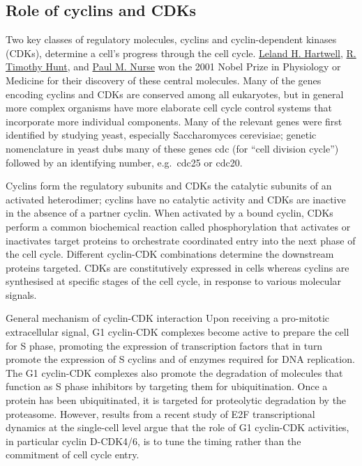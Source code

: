 \hypertarget{role-of-cyclins-and-cdks}{%
\subsection{Role of cyclins and CDKs}\label{role-of-cyclins-and-cdks}}

Two key classes of regulatory molecules, cyclins and cyclin-dependent kinases (CDKs), determine a cell's progress through the cell cycle. \href{https://en.wikipedia.org/wiki/Leland_H._Hartwell}{Leland H. Hartwell}, \href{https://en.wikipedia.org/wiki/Tim_Hunt}{R. Timothy Hunt}, and \href{https://en.wikipedia.org/wiki/Paul_Nurse}{Paul M. Nurse} won the 2001 Nobel Prize in Physiology or Medicine for their discovery of these central molecules. Many of the genes encoding cyclins and CDKs are conserved among all eukaryotes, but in general more complex organisms have more elaborate cell cycle control systems that incorporate more individual components. Many of the relevant genes were first identified by studying yeast, especially Saccharomyces cerevisiae; genetic nomenclature in yeast dubs many of these genes cdc (for ``cell division cycle'') followed by an identifying number, e.g.~cdc25 or cdc20.

Cyclins form the regulatory subunits and CDKs the catalytic subunits of an activated heterodimer; cyclins have no catalytic activity and CDKs are inactive in the absence of a partner cyclin. When activated by a bound cyclin, CDKs perform a common biochemical reaction called phosphorylation that activates or inactivates target proteins to orchestrate coordinated entry into the next phase of the cell cycle. Different cyclin-CDK combinations determine the downstream proteins targeted. CDKs are constitutively expressed in cells whereas cyclins are synthesised at specific stages of the cell cycle, in response to various molecular signals.

General mechanism of cyclin-CDK interaction
Upon receiving a pro-mitotic extracellular signal, G1 cyclin-CDK complexes become active to prepare the cell for S phase, promoting the expression of transcription factors that in turn promote the expression of S cyclins and of enzymes required for DNA replication. The G1 cyclin-CDK complexes also promote the degradation of molecules that function as S phase inhibitors by targeting them for ubiquitination. Once a protein has been ubiquitinated, it is targeted for proteolytic degradation by the proteasome. However, results from a recent study of E2F transcriptional dynamics at the single-cell level argue that the role of G1 cyclin-CDK activities, in particular cyclin D-CDK4/6, is to tune the timing rather than the commitment of cell cycle entry.

